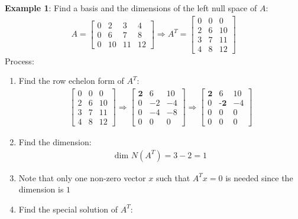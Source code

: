 \documentclass[10pt,a4paper]{article}
\begin{document}
\textbf{Example 1}: Find a basis and the dimensions of the left null space of $A$:
\begin{align*}
    A = \begin{bmatrix}
        0&2&3&4 \\
        0&6&7&8 \\
        0&10&11&12
    \end{bmatrix}  
    \Rightarrow 
    A^T = \begin{bmatrix}
        0&0&0 \\
        2&6&10 \\
        3&7&11 \\
        4&8&12
    \end{bmatrix}
\end{align*}
Process:
\begin{enumerate}
    \item Find the row echelon form of $A^T$:
    \begin{align*}
        \begin{bmatrix}
            0&0&0 \\
            2&6&10 \\
            3&7&11 \\
            4&8&12
        \end{bmatrix}
        \Rightarrow
        \begin{bmatrix}
            \textbf{2}&6&10 \\
            0&-2&-4 \\
            0&-4&-8 \\
            0&0&0 
        \end{bmatrix}
        \Rightarrow
        \begin{bmatrix}
            \textbf{2}&6&10 \\
            0&\textbf{-2}&-4 \\
            0&0&0 \\
            0&0&0
        \end{bmatrix}
    \end{align*}
    \item Find the dimension:
    \begin{align*}
        \text{dim }N(A^T) = 3 -2 = 1
    \end{align*}
    \item Note that only one non-zero vector $x$ such that $A^Tx=0$ is needed since the dimension is
    $1$
    \item Find the special solution of $A^T$:
    \begin{itemize}

\end{itemize}
\end{enumerate}
\end{document}
